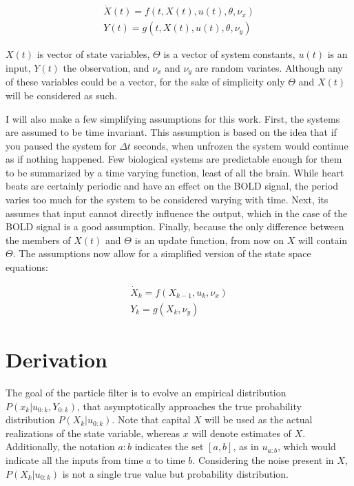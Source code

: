 \begin{eqnarray}
\dot{X}(t) = f(t, X(t), u(t), \theta, \nu_x) \nonumber \\
Y(t) = g(t, X(t), u(t), \theta, \nu_y)
\label{eq:GenericNonlinear}
\end{eqnarray}

$X(t)$ is vector of state variables, $\Theta$ is a vector of system
constants, $u(t)$ is an input, $Y(t)$ the observation, and
$\nu_x$ and $\nu_y$ are random variates. Although any of these
variables could be a vector, for the sake of simplicity only
$\Theta$ and $X(t)$ will be considered as such. 

I will also make a few  simplifying assumptions for this work. 
First, the systems are assumed to be 
time invariant. This 
assumption is based on the idea that if you paused the system for $\Delta t$
seconds, when unfrozen the system would continue as if nothing happened. 
Few biological systems are predictable enough for them to be summarized
by a time varying function, least of all the brain. While heart beats are certainly
periodic and have an effect on the BOLD signal, the period varies too much
for the system to be considered varying with time. 
Next, its assumes that input cannot directly
influence the output, which in the case of the BOLD signal is a good assumption.
Finally, because the only difference between the members of $X(t)$ and 
$\Theta$ is an update function, from now on $X$ will contain 
$\Theta$. The assumptions now allow for a simplified version of the
state space equations:

\begin{eqnarray}
\dot{X}_k = f(X_{k-1}, u_k, \nu_x)
\label{eq:stateass}\\
Y_k = g(X_k, \nu_y)
\label{eq:measass}
\end{eqnarray}

\section{Derivation}
The goal of the particle filter is to evolve an empirical distribution 
$P(x_k | u_{0:k}, Y_{0:k})$,
that asymptotically approaches the true probability distribution $P(X_k | u_{0:k})$.
Note that capital $X$ will be used as the actual realizations of 
the state variable, whereas $x$ will denote estimates of $X$.
Additionally, the notation $a:b$ indicates the set $[a,b]$,
as in $u_{a:b}$, which would indicate all the inputs from time $a$ to time $b$.
Considering the noise present in $X$,
 $P(X_k | u_{0:k})$ is not a single true value but probability distribution. 

